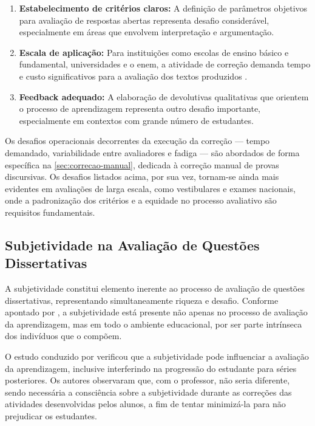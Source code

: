\begin{enumerate}
    \item \textbf{Estabelecimento de critérios claros:} A definição de parâmetros objetivos para avaliação de respostas abertas representa desafio considerável, especialmente em áreas que envolvem interpretação e argumentação.

    \item \textbf{Escala de aplicação:} Para instituições como escolas de ensino básico e fundamental, universidades e o \gls{enem}, a atividade de correção demanda tempo e custo significativos para a avaliação dos textos produzidos \cite{pinho_aplicacao_2024}.

    \item \textbf{Feedback adequado:} A elaboração de devolutivas qualitativas que orientem o processo de aprendizagem representa outro desafio importante, especialmente em contextos com grande número de estudantes.

\end{enumerate}

Os desafios operacionais decorrentes da execução da correção --- tempo demandado, variabilidade entre avaliadores e fadiga --- são abordados de forma específica na \autoref{sec:correcao-manual}, dedicada à correção manual de provas discursivas. Os desafios listados acima, por sua vez, tornam-se ainda mais evidentes em avaliações de larga escala, como vestibulares e exames nacionais, onde a padronização dos critérios e a equidade no processo avaliativo são requisitos fundamentais.

\subsection{Subjetividade na Avaliação de Questões Dissertativas}

A subjetividade constitui elemento inerente ao processo de avaliação de questões dissertativas, representando simultaneamente riqueza e desafio. Conforme apontado por , a subjetividade está presente não apenas no processo de avaliação da aprendizagem, mas em todo o ambiente educacional, por ser parte intrínseca dos indivíduos que o compõem.

O estudo conduzido por  verificou que a subjetividade pode influenciar a avaliação da aprendizagem, inclusive interferindo na progressão do estudante para séries posteriores. Os autores observaram que, com o professor, não seria diferente, sendo necessária a consciência sobre a subjetividade durante as correções das atividades desenvolvidas pelos alunos, a fim de tentar minimizá-la para não prejudicar os estudantes.

